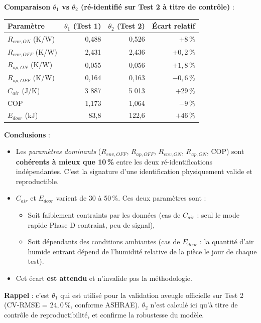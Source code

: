 \documentclass[11pt,a4paper]{article}
\begin{document}
\begin{exemple}
\textbf{Comparaison $\theta_1$ vs $\theta_2$ (ré-identifié sur Test 2 à titre de contrôle)} :

\begin{center}
\begin{tabular}{lrrr}
\toprule
\textbf{Paramètre} & \textbf{$\theta_1$ (Test 1)} & \textbf{$\theta_2$ (Test 2)} & \textbf{Écart relatif} \\
\midrule
$R_{env,ON}$ (K/W) & 0,488 & 0,526 & $+8\,\%$ \\
$R_{env,OFF}$ (K/W) & 2,431 & 2,436 & $+0{,}2\,\%$ \\
$R_{ap,ON}$ (K/W) & 0,055 & 0,056 & $+1{,}8\,\%$ \\
$R_{ap,OFF}$ (K/W) & 0,164 & 0,163 & $-0{,}6\,\%$ \\
$C_{air}$ (J/K) & 3 887 & 5 013 & $+29\,\%$ \\
COP & 1,173 & 1,064 & $-9\,\%$ \\
$E_{door}$ (kJ) & 83,8 & 122,6 & $+46\,\%$ \\
\bottomrule
\end{tabular}
\end{center}

\textbf{Conclusions} :
\begin{itemize}[itemsep=2pt]
\item Les \emph{paramètres dominants} ($R_{env,OFF}$, $R_{ap,OFF}$, $R_{env,ON}$,
$R_{ap,ON}$, COP) sont \textbf{cohérents à mieux que 10\,\%} entre les deux
ré-identifications indépendantes. C'est la signature d'une identification physiquement
valide et reproductible.
\item $C_{air}$ et $E_{door}$ varient de 30 à 50\,\%. Ces deux paramètres sont :
  \begin{itemize}[itemsep=0pt]
  \item Soit faiblement contraints par les données (cas de $C_{air}$ : seul le mode rapide
  Phase D contraint, peu de signal),
  \item Soit dépendants des conditions ambiantes (cas de $E_{door}$ : la quantité d'air
  humide entrant dépend de l'humidité relative de la pièce le jour de chaque test).
  \end{itemize}
\item Cet écart \textbf{est attendu} et n'invalide pas la méthodologie.
\end{itemize}

\textbf{Rappel} : c'est $\theta_1$ qui est utilisé pour la validation aveugle officielle
sur Test 2 (CV-RMSE = $24{,}0\,\%$, conforme ASHRAE). $\theta_2$ n'est calculé ici qu'à
titre de contrôle de reproductibilité, et confirme la robustesse du modèle.
\end{exemple}
\end{document}
